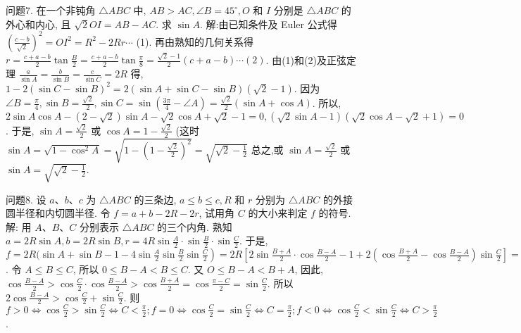 问题7. 在一个非钝角 $\triangle A B C$ 中, $A B>A C, \angle B=45^{\circ}, O$ 和 $I$ 分别是 $\triangle A B C$ 的外心和内心, 且 $\sqrt{2} O I=A B-A C$. 求 $\sin A$.
解:由已知条件及 Euler 公式得 $\left(\frac{c-b}{\sqrt{2}}\right)^2=O I^2=R^2-2 R r \cdots$ (1). 再由熟知的几何关系得 $r=\frac{c+a-b}{2} \tan \frac{B}{2}=\frac{c+a-b}{2} \tan \frac{\pi}{8}= \frac{\sqrt{2}-1}{2}(c+a-b) \cdots(2)$.
由(1)和(2)及正弦定理 $\frac{a}{\sin A}=\frac{b}{\sin B}=\frac{c}{\sin C}=2 R$ 得, $1-2(\sin C-\sin B)^2= 2(\sin A+\sin C-\sin B)(\sqrt{2}-1)$. 因为 $\angle B=\frac{\pi}{4}, \sin B=\frac{\sqrt{2}}{2}, \sin C= \sin \left(\frac{3 \pi}{4}-\angle A\right)=\frac{\sqrt{2}}{2}(\sin A+\cos A)$. 所以, $2 \sin A \cos A-(2-\sqrt{2}) \sin A- \sqrt{2} \cos A+\sqrt{2}-1=0,(\sqrt{2} \sin A-1)(\sqrt{2} \cos A-\sqrt{2}+1)=0$. 于是, $\sin A= \frac{\sqrt{2}}{2}$ 或 $\cos A=1-\frac{\sqrt{2}}{2}$ (这时 $\sin A=\sqrt{1-\cos ^2 A}=\sqrt{1-\left(1-\frac{\sqrt{2}}{2}\right)^2}=\sqrt{\sqrt{2}-\frac{1}{2}}$
总之,或 $\sin A=\frac{\sqrt{2}}{2}$ 或 $\sin A=\sqrt{\sqrt{2}-\frac{1}{2}}$.



问题8. 设 $a 、 b 、 c$ 为 $\triangle A B C$ 的三条边, $a \leqslant b \leqslant c, R$ 和 $r$ 分别为 $\triangle A B C$ 的外接圆半径和内切圆半径.
令 $f=a+b-2 R-2 r$, 试用角 $C$ 的大小来判定 $f$ 的符号.
解: 用 $A 、 B 、 C$ 分别表示 $\triangle A B C$ 的三个内角.
熟知 $a=2 R \sin A, b= 2 R \sin B, r=4 R \sin \frac{A}{2} \cdot \sin \frac{B}{2} \cdot \sin \frac{C}{2}$. 于是, $f=2 R(\sin A+\sin B-1- \left.4 \sin \frac{A}{2} \sin \frac{B}{2} \sin \frac{C}{2}\right)=2 R\left[2 \sin \frac{B+A}{2} \cdot \cos \frac{B-A}{2}-1+2\left(\cos \frac{B+A}{2}-\right.\right. \left.\left.\cos \frac{B-A}{2}\right) \sin \frac{C}{2}\right]=4 R \cos \frac{B-A}{2}\left(\sin \frac{B+A}{2}-\sin \frac{C}{2}\right)-2 R+4 R \cos \frac{\pi-C}{2} \sin \frac{C}{2}=4 R \cos \frac{B-A}{2}\left(\sin \frac{\pi-C}{2}-\sin \frac{C}{2}\right)-2 R+4 R \sin ^2 \frac{C}{2}= 4 R \cos \frac{B-A}{2}\left(\cos \frac{C}{2}-\sin \frac{C}{2}\right)-2 R\left(\cos ^2 \frac{C}{2}-\sin ^2 \frac{C}{2}\right)=2 R\left(\cos \frac{C}{2}-\sin \frac{C}{2}\right) \left(2 \cos \frac{B-A}{2}-\cos \frac{C}{2}-\sin \frac{C}{2}\right)$.
令 $A \leqslant B \leqslant C$, 所以 $0 \leqslant B-A<B \leqslant C$. 又 $O \leqslant B-A<B+A$, 因此, $\cos \frac{B-A}{2}>\cos \frac{C}{2} \cdot \cos \frac{B-A}{2}>\cos \frac{B+A}{2}=\cos \frac{\pi-C}{2}=\sin \frac{C}{2}$. 所以 $2 \cos \frac{B-A}{2}>\cos \frac{C}{2}+\sin \frac{C}{2}$. 则 $f>0 \Leftrightarrow \cos \frac{C}{2}>\sin \frac{C}{2} \Leftrightarrow C<\frac{\pi}{2} ; f=0 \Leftrightarrow \cos \frac{C}{2}=\sin \frac{C}{2} \Leftrightarrow C=\frac{\pi}{2} ; f<0 \Leftrightarrow \cos \frac{C}{2}<\sin \frac{C}{2} \Leftrightarrow C>\frac{\pi}{2}$.



